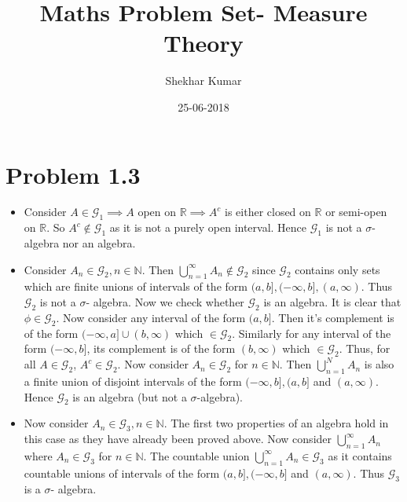 \documentclass[letterpaper,12pt]{article}
\title{\textbf{Maths Problem Set- Measure Theory}}
\author{Shekhar Kumar}
\date{25-06-2018}
\theoremstyle{definition}
\begin{document}
  \maketitle

  \section*{Problem 1.3}
    \begin{itemize}

      \item Consider $A \in \mathcal{G}_1 \implies A$ open on $\mathbb{R}\implies {A}^c$
      is either closed on $\mathbb{R}$ or semi-open on $\mathbb{R}$. So ${A}^c \notin \mathcal{G}_1$
      as it is not a purely open interval. Hence $\mathcal{G}_1$ is not a $\sigma$- algebra nor an algebra.

      \item Consider $A_n \in \mathcal{G}_2, n \in \mathbb{N}$. Then $\bigcup_{n=1}^{\infty}A_n \notin \mathcal{G}_2$
      since $\mathcal{G}_2$ contains only sets which are finite unions of intervals of the form $(a, b], (-\infty, b], (a, \infty)$.
      Thus $\mathcal{G}_2$ is not a $\sigma$- algebra. Now we check whether $\mathcal{G}_2$  is an algebra.
      It is clear that $\phi \in \mathcal{G}_2$. Now consider any interval of the form $(a,b]$.
      Then it's complement is of the form $(-\infty,a] \cup (b, \infty)$ which $\in \mathcal{G}_2$. Similarly for any interval of the form
      $(-\infty, b]$, its complement is of the form $(b, \infty)$ which $\in \mathcal{G}_2$. Thus, for all $A \in \mathcal{G}_2$, ${A}^c \in \mathcal{G}_2$.
      Now consider ${A}_n \in \mathcal{G}_2$ for $n \in \mathbb{N}$. Then $\bigcup_{n=1}^{N}A_{n}$ is also a finite union
      of disjoint intervals of the form $(-\infty, b], (a,b]$ and  $(a, \infty)$. Hence $\mathcal{G}_2$ is an algebra (but not a $\sigma$-algebra).

      \item Now consider $A_n \in \mathcal{G}_3, n \in \mathbb{N}$. The first two properties of an algebra hold in this case
      as they have already been proved above. Now consider $\bigcup_{n=1}^{\infty}A_{n}$ where ${A}_n \in \mathcal{G}_3$ for $n \in \mathbb{N}$.
      The countable union $\bigcup_{n=1}^{\infty}A_{n} \in \mathcal{G}_3$ as it contains countable unions of intervals of the form
      $(a,b], (-\infty, b]$ and $(a, \infty)$. Thus $\mathcal{G}_3$ is a $\sigma$- algebra.

    \end{itemize}
\end{document}
